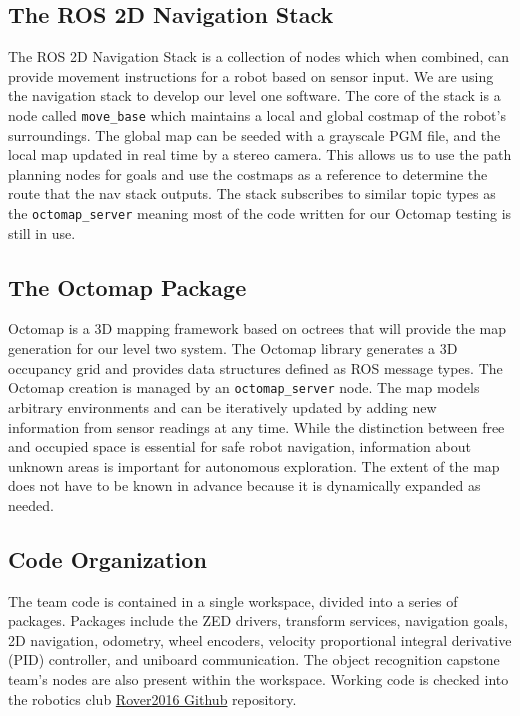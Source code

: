 \documentclass[10pt, oneside,onecolumn]{IEEEtran}
\begin{document}
\begin{titlepage}
\subsection{The ROS 2D Navigation Stack}
The ROS 2D Navigation Stack is a collection of nodes which when combined, can provide movement instructions for a robot based on sensor input. We are using the navigation stack to develop our level one software. The core of the stack is a node called \texttt{move\_base} which maintains a local and global costmap of the robot's surroundings. The global map can be seeded with a grayscale PGM file, and the local map updated in real time by a stereo camera. This allows us to use the path planning nodes for goals and use the costmaps as a reference to determine the route that the nav stack outputs. The stack subscribes to similar topic types as the \texttt{octomap\_server} meaning most of the code written for our Octomap testing is still in use.

\subsection{The Octomap Package}
Octomap is a 3D mapping framework based on octrees that will provide the map generation for our level two system. The Octomap library generates a 3D occupancy grid and provides data structures defined as ROS message types. The Octomap creation is managed by an \texttt{octomap\_server} node. The map models arbitrary environments and can be iteratively updated by adding new information from sensor readings at any time. While the distinction between free and occupied space is essential for safe robot navigation, information about unknown areas is important for autonomous exploration. The extent of the map does not have to be known in advance because it is dynamically expanded as needed. 

\subsection{Code Organization}
The team code is contained in a single workspace, divided into a series of packages. Packages include the ZED drivers, transform services, navigation goals, 2D navigation, odometry, wheel encoders, velocity proportional integral derivative (PID) controller, and uniboard communication. The object recognition capstone team's nodes are also present within the workspace. Working code is checked into the robotics club \href{https://github.com/OSURoboticsClub/Rover2016}{Rover2016 Github} repository. 


\end{titlepage}
\end{document}
